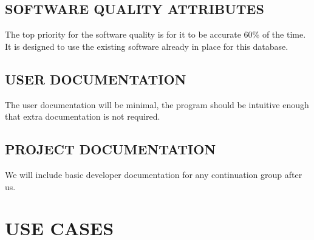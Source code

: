 \documentclass[11pt]{article}
\begin{document}
\subsection{SOFTWARE QUALITY ATTRIBUTES}
The top priority for the software quality is for it to be accurate 60\% of the time. It is designed to use the existing software already in place for this database. 
\subsection{USER DOCUMENTATION}
The user documentation will be minimal, the program should be intuitive enough that extra documentation is not required.
\subsection{PROJECT DOCUMENTATION}
We will include basic developer documentation for any continuation group after us.

\section{USE CASES}

%
\end{document}
